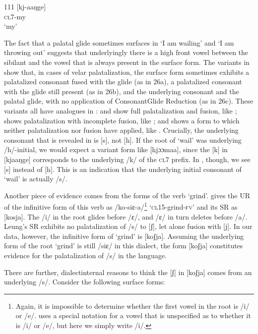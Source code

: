 \documentclass[output=paper]{langsci/langscibook}
\begin{document}
\begin{tabular}{111}
\ex\label{ex:glewwe:26c}{}
 [kj-aaŋge]\\{}
\textsc{cl7}-my\\{}
\glt ‘my’
\z
\z 

The fact that a palatal glide sometimes surfaces in ‘I am wailing’ and ‘I am throwing out’ suggests that underlyingly there is a high front vowel between the sibilant and the vowel that is always present in the surface form. The variants in  show that, in cases of velar palatalization, the surface form sometimes exhibits a palatalized consonant fused with the glide (as in 26a), a palatalized consonant with the glide still present (as in 26b), and the underlying consonant and the palatal glide, with no application of ConsonantGlide Reduction (as in 26c). These variants all have analogues in :  and  show full palatalization and fusion, like ;  shows palatalization with incomplete fusion, like ; and  shows a form to which neither palatalization nor fusion have applied, like . Crucially, the underlying consonant that is revealed in  is [s], not [h]. If the root of ‘wail’ was underlying /h/-initial, we would expect a variant form like [hjɔɔmaa], since the [k] in [kjaaŋge] corresponds to the underlying /k/ of the \textsc{cl}7 prefix. In , though, we see [s] instead of [h]. This is an indication that the underlying initial consonant of ‘wail’ is actually /s/. 

Another piece of evidence comes from the forms of the verb ‘grind’. \citet{Leung1991} gives the UR of the infinitive form of this verb as /ko-siɛ-a/\footnote{Again, it is impossible to determine whether the first vowel in the root is /i/ or /e/. \citet{Leung1991} uses a special notation for a vowel that is unspecified as to whether it is /i/ or /e/, but here we simply write /i/.}  ‘\textsc{cl}15-grind-\textsc{fv}’ and its SR as [kosja]. The /i/ in the root glides before /ɛ/, and /ɛ/ in turn deletes before /a/. Leung’s SR exhibits no palatalization of /s/ to [ʃ], let alone fusion with [j]. In our data, however, the infinitive form of ‘grind’ is [koʃja]. Assuming the underlying form of the root ‘grind’ is still /siɛ/ in this dialect, the form [koʃja] constitutes evidence for the palatalization of /s/ in the language. 

There are further, dialectinternal reasons to think the [ʃ] in [koʃja] comes from an underlying /s/. Consider the following surface forms:


\end{tabular}
\end{document}
